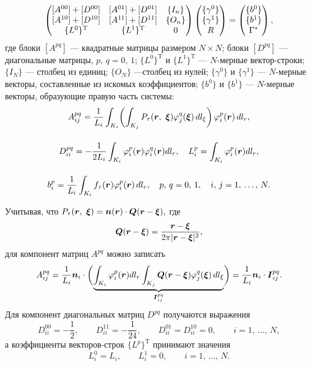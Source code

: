 \documentclass[12pt, a4paper]{article}
\renewcommand{\vec}[1]{\text{\mathversion{bold}${#1}$}}%
\begin{document}
\begin{equation}
\label{sys1}
\begin{pmatrix}
[A^{00}] + [D^{00}] & [A^{01}] + [D^{01}] & \{I_n\} \\
[A^{10}] + [D^{10}] & [A^{11}] + [D^{11}] & \{O_n\}\\
\{L^0\}^{\mathrm{T}} & \{L^1\}^{\mathrm{T}} & 0
\end{pmatrix}
\left(
\begin{array}{@{}c@{}}
\{\gamma^0\}\\
\{\gamma^1\}\\
R
\end{array}
\right)
=
\left(
\begin{array}{@{}c@{}}
\{b^0\} \\
\{b^1\}\\
\Gamma^\ast
\end{array}
\right),
\end{equation}
где блоки $[A^{pq}]$ --- квадратные матрицы размером $N\times N$; блоки $[D^{pq}]$ --- диагональные матрицы, $p,\,q = 0,\,1$; $\{L^0\}^{\mathrm{T}}$ и $\{L^1\}^{\mathrm{T}}$ --- $N$-мерные вектор-строки; $\{I_N\}$ --- столбец из единиц; $\{O_N\}$ ---столбец из нулей; $\{\gamma^0\}$ и $\{\gamma^1\}$ --- $N$-мерные векторы, составленные из искомых коэффициентов; $\{b^0\}$ и $\{b^1\}$ --- $N$-мерные векторы, образующие правую часть системы:
\begin{gather*}
A_{ij}^{pq} =\frac{1}{L_i}\int _{K_{i} }\biggl(\int _{K_{j} }P_\tau(\vec{r},\, \, \vec{\xi })\varphi _{j}^{q} (\vec{\xi })\, dl_{\xi }  \biggr) \, \varphi _{i}^{p} (\vec{r})\, dl_{r} ,\\[4mm]
D_{ii}^{pq} = -\frac 1{2L_i} \int_{K_i}\varphi_{i}^{p}(\vec r) \varphi_{i}^{q}(\vec r) dl_r, \quad L_i^p = \int_{K_i} \varphi_{i}^{p}(\vec r) dl_r, \\[4mm]
b_{i}^{p} =\frac{1}{L_i}\int_{K_i}f_\tau(\vec{r}) \varphi_{i}^{p} (\vec{r})\, dl_{r} , \quad    p,\, q=0,\, 1,\quad   i,\, j=1,\,\ldots, \, N.
\end{gather*}

Учитывая, что $P_\tau(\vec{r},\, \, \vec{\xi }) = \vec n(\vec r) \cdot \vec Q(\vec{r}- \vec{\xi }),$ где
\[
	\vec Q(\vec r - \vec\xi) = \dfrac{\vec r-\vec\xi}{2\pi |\vec r-\vec\xi|^2},
\]
для компонент матриц $A^{pq}$ можно записать
\[
A_{ij}^{pq} = \frac{1}{L_i}\vec n_i \cdot \biggl(\underbrace{\int _{K_{i}} \varphi _{i}^{p} (\vec{r}) dl_{r} \int _{K_{j} } \vec Q(\vec{r}- \vec{\xi })\varphi _{j}^{q} (\vec{\xi })\, dl_{\xi }}_{\vec I^{pq}_{ij}} \biggr) = \frac{1}{L_i}\vec n_i \cdot \vec{I}_{ij}^{pq}.
\]
 Для компонент диагональных матриц $D^{pq}$ получаются выражения
\[
D_{ii}^{00} = -\frac {1}2, \qquad D_{ii}^{11} = -\frac {1}{24}, \qquad D_{ii}^{01} = D_{ii}^{10} = 0, \qquad i=1,\,\ldots, \, N,
\]
а коэффициенты векторов-строк $\{L^p\}^{\mathrm{T}}$ принимают значения
\[
L_i^0 = L_i, \qquad L_i^1 = 0, \qquad i=1,\,\ldots, \, N.
\]
\end{document}
